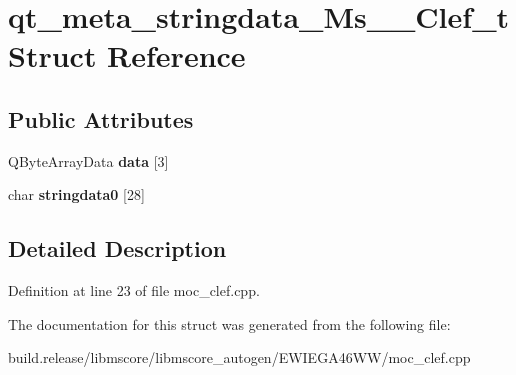\hypertarget{structqt__meta__stringdata___ms_____clef__t}{}\section{qt\+\_\+meta\+\_\+stringdata\+\_\+\+Ms\+\_\+\+\_\+\+Clef\+\_\+t Struct Reference}
\label{structqt__meta__stringdata___ms_____clef__t}
\subsection*{Public Attributes}
\begin{DoxyCompactItemize}
\item 
\mbox{\label{structqt__meta__stringdata___ms_____clef__t_acd4764e8536c9351d642442ee98b49ed}} 
Q\+Byte\+Array\+Data {\bfseries data} \mbox{[}3\mbox{]}
\item 
\mbox{\label{structqt__meta__stringdata___ms_____clef__t_a1446b4b436f2595d55eda0b2e3027ec1}} 
char {\bfseries stringdata0} \mbox{[}28\mbox{]}
\end{DoxyCompactItemize}


\subsection{Detailed Description}


Definition at line 23 of file moc\+\_\+clef.\+cpp.



The documentation for this struct was generated from the following file\+:\begin{DoxyCompactItemize}
\item 
build.\+release/libmscore/libmscore\+\_\+autogen/\+E\+W\+I\+E\+G\+A46\+W\+W/moc\+\_\+clef.\+cpp\end{DoxyCompactItemize}
